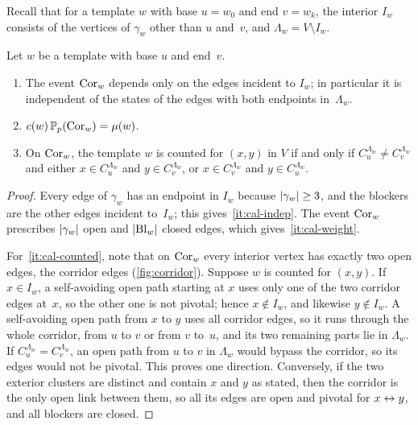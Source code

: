 Recall that for a template $w$ with base $u=w_0$ and end $v=w_k$, the interior $I_w$ consists of the
vertices of $\gamma_w$ other than $u$ and~$v$, and $\Lambda_w=V\setminus I_w$.

\begin{lemma}\label{lem:calibration}
Let $w$ be a template with base $u$ and end~$v$.
\begin{enumerate}[label=\textup{(\alph*)}]
  \item\label{it:cal-indep} The event $\mathrm{Cor}_w$ depends only on the edges incident to $I_w$; in particular
  it is independent of the states of the edges with both endpoints in~$\Lambda_w$.
  \item\label{it:cal-weight} $c(w)\,\mathbb P_p(\mathrm{Cor}_w)=\mu(w)$.
  \item\label{it:cal-counted} On $\mathrm{Cor}_w$, the template $w$ is counted for $(x,y)$ in $V$ if and only if
  $C_u^{\Lambda_w}\neq C_v^{\Lambda_w}$ and either $x\in C_u^{\Lambda_w}$ and $y\in C_v^{\Lambda_w}$, or
  $x\in C_v^{\Lambda_w}$ and $y\in C_u^{\Lambda_w}$.
\end{enumerate}
\end{lemma}

\begin{proof}
Every edge of $\gamma_w$ has an endpoint in $I_w$ because $\lvert\gamma_w\rvert\ge3$, and the blockers are the
other edges incident to~$I_w$; this gives~\ref{it:cal-indep}. The event $\mathrm{Cor}_w$ prescribes
$\lvert\gamma_w\rvert$ open and $\lvert\mathrm{Bl}_w\rvert$ closed edges, which gives~\ref{it:cal-weight}.

For~\ref{it:cal-counted}, note that on $\mathrm{Cor}_w$ every interior vertex has exactly two open edges, the
corridor edges (\cref{fig:corridor}). Suppose $w$ is counted for $(x,y)$. If $x\in I_w$, a
self-avoiding open path starting at $x$ uses only one of the two corridor edges at~$x$, so the other one
is not pivotal; hence $x\notin I_w$, and likewise $y\notin I_w$. A self-avoiding open path from $x$ to $y$ uses all corridor
edges, so it runs through the whole corridor, from $u$ to $v$ or from $v$ to~$u$, and its two remaining
parts lie in $\Lambda_w$. If $C_u^{\Lambda_w}=C_v^{\Lambda_w}$, an open path from $u$ to $v$ in
$\Lambda_w$ would bypass the corridor, so its edges would not be pivotal. This proves one direction.
Conversely, if the two exterior clusters are distinct and contain $x$ and $y$ as stated, then the
corridor is the only open link between them, so all its edges are open and pivotal for $x\leftrightarrow y$, and
all blockers are closed.
\end{proof}

